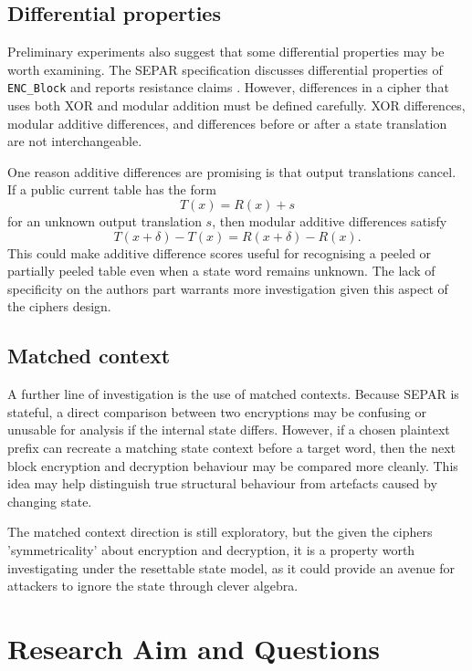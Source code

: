 \documentclass[11pt]{article}
\begin{document}
\subsection{Differential properties}

Preliminary experiments also suggest that some differential properties may be worth examining. The SEPAR specification discusses differential properties of \texttt{ENC\_Block} and reports resistance claims \cite{VahiJassbi2020,VahiMirnia2021}. However, differences in a cipher that uses both XOR and modular addition must be defined carefully. XOR differences, modular additive differences, and differences before or after a state translation are not interchangeable.

One reason additive differences are promising is that output translations cancel. If a public current table has the form
\[
T(x)=R(x)+s
\]
for an unknown output translation $s$, then modular additive differences satisfy
\[
T(x+\delta)-T(x)=R(x+\delta)-R(x).
\]
This could make additive difference scores useful for recognising a peeled or partially peeled table even when a state word remains unknown. The lack of specificity on the authors part warrants more investigation given this aspect of the ciphers design.

\subsection{Matched context}

A further line of investigation is the use of matched contexts. Because SEPAR is stateful, a direct comparison between two encryptions may be confusing or unusable for analysis if the internal state differs. However, if a chosen plaintext prefix can recreate a matching state context before a target word, then the next block encryption and decryption behaviour may be compared more cleanly. This idea may help distinguish true structural behaviour from artefacts caused by changing state.

The matched context direction is still exploratory, but the given the ciphers 'symmetricality' about encryption and decryption, it is a property worth investigating under the resettable state model, as it could provide an avenue for attackers to ignore the state through clever algebra.

\section{Research Aim and Questions}
\end{document}
